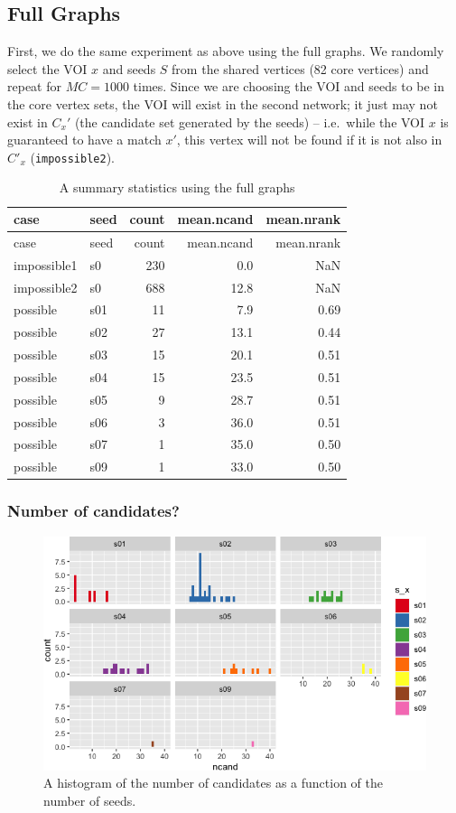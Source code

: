 \documentclass[
]{article}
\begin{document}
\hypertarget{full-graphs}{%
\subsection{Full Graphs}\label{full-graphs}}

First, we do the same experiment as above using the full graphs. We
randomly select the VOI \(x\) and seeds \(S\) from the shared vertices
(82 core vertices) and repeat for \(MC=1000\) times. Since we are
choosing the VOI and seeds to be in the core vertex sets, the VOI will
exist in the second network; it just may not exist in \(C_x'\) (the
candidate set generated by the seeds) -- i.e.~while the VOI \(x\) is
guaranteed to have a match \(x'\), this vertex will not be found if it
is not also in \(C'_x\) (\texttt{impossible2}).

\begin{longtable}[]{@{}llrrr@{}}
\caption{A summary statistics using the full graphs}\tabularnewline
\toprule
case & seed & count & mean.ncand & mean.nrank\tabularnewline
\midrule
\endfirsthead
\toprule
case & seed & count & mean.ncand & mean.nrank\tabularnewline
\midrule
\endhead
impossible1 & s0 & 230 & 0.0 & NaN\tabularnewline
impossible2 & s0 & 688 & 12.8 & NaN\tabularnewline
possible & s01 & 11 & 7.9 & 0.69\tabularnewline
possible & s02 & 27 & 13.1 & 0.44\tabularnewline
possible & s03 & 15 & 20.1 & 0.51\tabularnewline
possible & s04 & 15 & 23.5 & 0.51\tabularnewline
possible & s05 & 9 & 28.7 & 0.51\tabularnewline
possible & s06 & 3 & 36.0 & 0.51\tabularnewline
possible & s07 & 1 & 35.0 & 0.50\tabularnewline
possible & s09 & 1 & 33.0 & 0.50\tabularnewline
\bottomrule
\end{longtable}

\hypertarget{number-of-candidates-1}{%
\subsubsection{Number of candidates?}\label{number-of-candidates-1}}

\begin{figure}
\centering
\includegraphics{vn_files/figure-latex/cand2-1.png}
\caption{A histogram of the number of candidates as a function of the
number of seeds.}
\end{figure}
\end{document}
